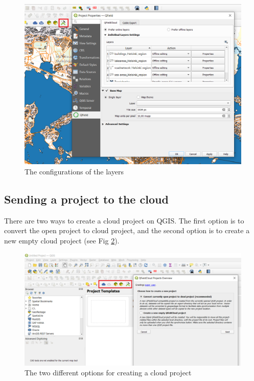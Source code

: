 \documentclass{article}
\begin{document}
\begin{figure}[H]
    \centering
    \includegraphics[width=1\textwidth]{qgis-project-properties.png}
    \caption{The configurations of the layers}
    \label{fig:qgis-create-cloud-project}
\end{figure}


\subsection{Sending a project to the cloud}
There are two ways to create a cloud project on QGIS. The first option is to convert the open project to cloud project, and the second option is to create a new empty cloud project (see Fig \ref{fig:qgis-create-cloud-project}).

\begin{figure}[H]
    \centering
    \includegraphics[width=1\textwidth]{qgis-create-cloud-project.png}
    \caption{The two different options for creating a cloud project}
    \label{fig:qgis-create-cloud-project}
\end{figure}
\end{document}
